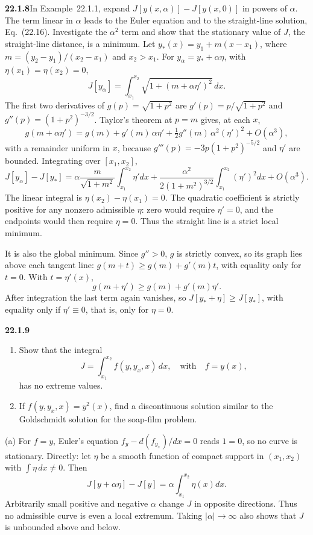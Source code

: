 \par\bigskip
\noindent\textbf{22.1.8}\quad In Example~22.1.1, expand
$J[y(x,\alpha)]-J[y(x,0)]$ in powers of $\alpha$. The term
linear in $\alpha$ leads to the Euler equation and to the
straight-line solution, Eq.~(22.16). Investigate the $\alpha^{2}$
term and show that the stationary value of $J$, the straight-line
distance, is a minimum.
\solution
Let $y_*(x)=y_1+m(x-x_1)$, where
$m=(y_2-y_1)/(x_2-x_1)$ and $x_2>x_1$.
For $y_\alpha=y_*+\alpha\eta$, with $\eta(x_1)=\eta(x_2)=0$,
\[
J[y_\alpha]=\int_{x_1}^{x_2}
\sqrt{1+(m+\alpha\eta')^2}\,dx.
\]
The first two derivatives of $g(p)=\sqrt{1+p^2}$ are
$g'(p)=p/\sqrt{1+p^2}$ and $g''(p)=(1+p^2)^{-3/2}$.
Taylor's theorem at $p=m$ gives, at each $x$,
\[
g(m+\alpha\eta')=g(m)+g'(m)\,\alpha\eta'
+\tfrac12g''(m)\,\alpha^2(\eta')^2+O(\alpha^3),
\]
with a remainder uniform in $x$, because
$g'''(p)=-3p(1+p^2)^{-5/2}$ and $\eta'$ are bounded. Integrating over
$[x_1,x_2]$,
\[
J[y_\alpha]-J[y_*]
=\alpha\frac{m}{\sqrt{1+m^2}}\int_{x_1}^{x_2}\eta'dx
+\frac{\alpha^2}{2(1+m^2)^{3/2}}
\int_{x_1}^{x_2}(\eta')^2dx+O(\alpha^3).
\]
The linear integral is $\eta(x_2)-\eta(x_1)=0$.
The quadratic coefficient is strictly positive for any nonzero
admissible $\eta$: zero would require $\eta'=0$, and the endpoints
would then require $\eta=0$. Thus the straight line is a strict
local minimum.

It is also the global minimum. Since $g''>0$, $g$ is strictly convex,
so its graph lies above each tangent line: $g(m+t)\ge g(m)+g'(m)t$,
with equality only for $t=0$. With $t=\eta'(x)$,
\[
g(m+\eta')\ge g(m)+g'(m)\eta'.
\]
After integration the last term again vanishes, so
$J[y_*+\eta]\ge J[y_*]$, with equality only if $\eta'\equiv0$, that is,
only for $\eta=0$.


\par\bigskip
\noindent\textbf{22.1.9}\quad
{}
\begin{enumerate}
\item[(a)] Show that the integral
\[
J=\int_{x_{1}}^{x_{2}}f(y,y_{x},x)\,dx,
\quad\text{with}\quad f=y(x),
\]
has no extreme values.
\item[(b)] If $f(y,y_{x},x)=y^{2}(x)$, find a discontinuous
solution similar to the Goldschmidt solution for the soap-film
problem.
\end{enumerate}
\solution
(a) For $f=y$, Euler's equation $f_y-d(f_{y_x})/dx=0$ reads $1=0$,
so no curve is stationary. Directly: let $\eta$ be a smooth function of
compact support in $(x_1,x_2)$ with $\int\eta\,dx\ne0$. Then
\[
J[y+\alpha\eta]-J[y]=\alpha\int_{x_1}^{x_2}\eta(x)dx.
\]
Arbitrarily small positive and negative $\alpha$ change $J$ in
opposite directions. Thus no admissible curve is even a local
extremum. Taking $|\alpha|\to\infty$ also shows that $J$ is
unbounded above and below.

